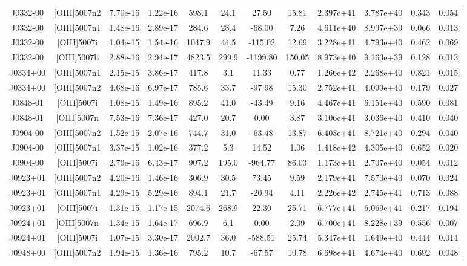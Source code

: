 \begin{table}
\begin{tabular}{cccccccccccc}
J0332-00 & [OIII]5007n2 & 7.70e-16 & 1.22e-16 & 598.1 & 24.1 & 27.50 & 15.81 & 2.397e+41 & 3.787e+40 & 0.343 & 0.054 \\
J0332-00 & [OIII]5007n1 & 1.48e-16 & 2.89e-17 & 284.6 & 28.4 & -68.00 & 7.26 & 4.611e+40 & 8.997e+39 & 0.066 & 0.013 \\
J0332-00 & [OIII]5007i & 1.04e-15 & 1.54e-16 & 1047.9 & 44.5 & -115.02 & 12.69 & 3.228e+41 & 4.793e+40 & 0.462 & 0.069 \\
J0332-00 & [OIII]5007b & 2.88e-16 & 2.94e-17 & 4823.5 & 299.9 & -1199.80 & 150.05 & 8.973e+40 & 9.163e+39 & 0.128 & 0.013 \\
J0334+00 & [OIII]5007n1 & 2.15e-15 & 3.86e-17 & 417.8 & 3.1 & 11.33 & 0.77 & 1.266e+42 & 2.268e+40 & 0.821 & 0.015 \\
J0334+00 & [OIII]5007n2 & 4.68e-16 & 6.97e-17 & 785.6 & 33.7 & -97.98 & 15.30 & 2.752e+41 & 4.099e+40 & 0.179 & 0.027 \\
J0848-01 & [OIII]5007i & 1.08e-15 & 1.49e-16 & 895.2 & 41.0 & -43.49 & 9.16 & 4.467e+41 & 6.151e+40 & 0.590 & 0.081 \\
J0848-01 & [OIII]5007n & 7.53e-16 & 7.36e-17 & 427.0 & 20.7 & 0.00 & 3.87 & 3.106e+41 & 3.036e+40 & 0.410 & 0.040 \\
J0904-00 & [OIII]5007n2 & 1.52e-15 & 2.07e-16 & 744.7 & 31.0 & -63.48 & 13.87 & 6.403e+41 & 8.721e+40 & 0.294 & 0.040 \\
J0904-00 & [OIII]5007n1 & 3.37e-15 & 1.02e-16 & 377.2 & 5.3 & 14.52 & 1.06 & 1.418e+42 & 4.305e+40 & 0.652 & 0.020 \\
J0904-00 & [OIII]5007i & 2.79e-16 & 6.43e-17 & 907.2 & 195.0 & -964.77 & 86.03 & 1.173e+41 & 2.707e+40 & 0.054 & 0.012 \\
J0923+01 & [OIII]5007n2 & 4.20e-16 & 1.46e-16 & 306.9 & 30.5 & 73.45 & 9.59 & 2.179e+41 & 7.570e+40 & 0.070 & 0.024 \\
J0923+01 & [OIII]5007n1 & 4.29e-15 & 5.29e-16 & 894.1 & 21.7 & -20.94 & 4.11 & 2.226e+42 & 2.745e+41 & 0.713 & 0.088 \\
J0923+01 & [OIII]5007i & 1.31e-15 & 1.17e-15 & 2074.6 & 268.9 & 22.30 & 25.71 & 6.777e+41 & 6.069e+41 & 0.217 & 0.194 \\
J0924+01 & [OIII]5007n & 1.34e-15 & 1.64e-17 & 696.9 & 6.1 & 0.00 & 2.09 & 6.700e+41 & 8.228e+39 & 0.556 & 0.007 \\
J0924+01 & [OIII]5007i & 1.07e-15 & 3.30e-17 & 2002.7 & 36.0 & -588.51 & 25.74 & 5.347e+41 & 1.649e+40 & 0.444 & 0.014 \\
J0948+00 & [OIII]5007n2 & 1.94e-15 & 1.36e-16 & 795.2 & 10.7 & -67.57 & 10.78 & 6.698e+41 & 4.674e+40 & 0.692 & 0.048 \\

\end{tabular}
\end{table}
